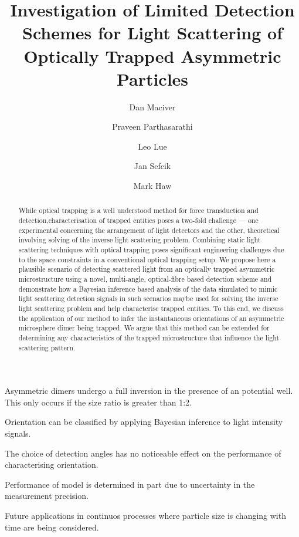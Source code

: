 \documentclass[final,  3p]{elsarticle}
\begin{document}
\begin{frontmatter}

\title{Investigation of Limited Detection Schemes for Light Scattering of Optically Trapped Asymmetric Particles}


\author[aff1]{Dan Maciver} 

\author[aff1]{Praveen Parthasarathi}

\author[aff1]{Leo Lue}

\author[aff1]{Jan Sefcik}

\author[aff1]{Mark Haw}






\begin{abstract}
  While optical trapping is a well understood method for force
  transduction and detection,characterisation of trapped entities
  poses a two-fold challenge --- one experimental concerning the
  arrangement of light detectors and the other, theoretical involving
  solving of the inverse light scattering problem. Combining static
  light scattering techniques with optical trapping poses significant
  engineering challenges due to the space constraints in a
  conventional optical trapping setup.  We propose here a plausible
  scenario of detecting scattered light from an optically trapped
  asymmetric microstructure using a novel, multi-angle, optical-fibre
  based detection scheme and demonstrate how a Bayesian inference
  based analysis of the data simulated to mimic light scattering
  detection signals in such scenarios maybe used for solving the
  inverse light scattering problem and help characterise trapped
  entities.  To this end, we discuss the application of our method to
  infer the instantaneous orientations of an asymmetric microsphere
  dimer being trapped. We argue that this method can be extended for
  determining any characteristics of the trapped microstructure that
  influence the light scattering pattern.
\end{abstract}

\begin{highlights}
\item Asymmetric dimers undergo a full inversion in the presence of an potential well. This only occurs if the size ratio is greater than 1:2.  
\item Orientation can be classified by applying Bayesian inference to light intensity signals. 
\item The choice of detection angles has no noticeable effect on the performance of characterising orientation.
\item Performance of model is determined in part due to uncertainty in the measurement precision. 
\item Future applications in continuos processes where particle size is changing with time are being considered.  
\end{highlights}


\end{frontmatter}
\end{document}
